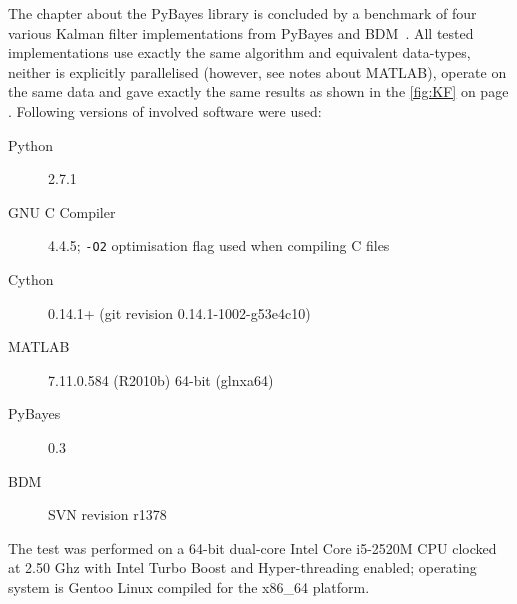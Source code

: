 The chapter about the PyBayes library is concluded by a benchmark of four various Kalman filter
implementations from PyBayes and BDM~\cite{BDM}. All tested implementations use exactly the same
algorithm and equivalent data-types, neither is explicitly parallelised (however, see notes about
MATLAB), operate on the same data and gave exactly the same results as shown in the \autoref{fig:KF}
on page \pageref{fig:KF}. Following versions of involved software were used:
\begin{description}
	\item[Python] 2.7.1
	\item[GNU C Compiler] 4.4.5; \verb|-O2| optimisation flag used when compiling C files
	\item[Cython] 0.14.1+ (git revision 0.14.1-1002-g53e4c10)
	\item[MATLAB] 7.11.0.584 (R2010b) 64-bit (glnxa64)
	\vspace{1mm}
	\item[PyBayes] 0.3
	\item[BDM] SVN revision r1378
\end{description}

The test was performed on a 64-bit dual-core Intel Core i5-2520M CPU clocked at 2.50 Ghz with Intel Turbo
Boost and Hyper-threading enabled; operating system is Gentoo Linux compiled for the x86\_64 platform.

